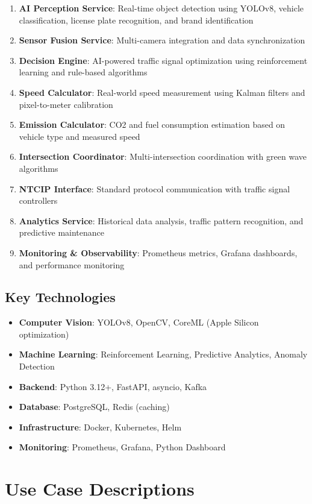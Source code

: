 \documentclass[12pt,a4paper]{article}
\begin{document}
\begin{enumerate}
    \item \textbf{AI Perception Service}: Real-time object detection using YOLOv8, vehicle classification, license plate recognition, and brand identification
    \item \textbf{Sensor Fusion Service}: Multi-camera integration and data synchronization
    \item \textbf{Decision Engine}: AI-powered traffic signal optimization using reinforcement learning and rule-based algorithms
    \item \textbf{Speed Calculator}: Real-world speed measurement using Kalman filters and pixel-to-meter calibration
    \item \textbf{Emission Calculator}: CO2 and fuel consumption estimation based on vehicle type and measured speed
    \item \textbf{Intersection Coordinator}: Multi-intersection coordination with green wave algorithms
    \item \textbf{NTCIP Interface}: Standard protocol communication with traffic signal controllers
    \item \textbf{Analytics Service}: Historical data analysis, traffic pattern recognition, and predictive maintenance
    \item \textbf{Monitoring \& Observability}: Prometheus metrics, Grafana dashboards, and performance monitoring
\end{enumerate}

\subsection{Key Technologies}
\begin{itemize}
    \item \textbf{Computer Vision}: YOLOv8, OpenCV, CoreML (Apple Silicon optimization)
    \item \textbf{Machine Learning}: Reinforcement Learning, Predictive Analytics, Anomaly Detection
    \item \textbf{Backend}: Python 3.12+, FastAPI, asyncio, Kafka
    \item \textbf{Database}: PostgreSQL, Redis (caching)
    \item \textbf{Infrastructure}: Docker, Kubernetes, Helm
    \item \textbf{Monitoring}: Prometheus, Grafana, Python Dashboard
\end{itemize}

\section{Use Case Descriptions}
\end{document}
